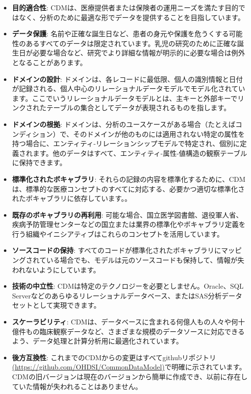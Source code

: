 \documentclass[
  11pt]{book}
\providecommand{\tightlist}{%
  \setlength{\itemsep}{0pt}\setlength{\parskip}{0pt}}
\theoremstyle{definition}
\theoremstyle{definition}
\theoremstyle{definition}
\theoremstyle{definition}
\theoremstyle{remark}
\begin{document}
\begin{itemize}
\tightlist
\item
  \textbf{目的適合性}: CDMは、医療提供者または保険者の運用ニーズを満たす目的ではなく、分析のために最適な形でデータを提供することを目指しています。 
\item
  \textbf{データ保護}: 名前や正確な誕生日など、患者の身元や保護を危うくする可能性のあるすべてのデータは限定されています。乳児の研究のために正確な誕生日が必要な場合など、研究でより詳細な情報が明示的に必要な場合は例外となることがあります。 
\item
  \textbf{ドメインの設計}: ドメインは、各レコードに最低限、個人の識別情報と日付が記録される、個人中心のリレーショナルデータモデルでモデル化されています。ここでいうリレーショナルデータモデルとは、主キーと外部キーでリンクされたテーブルの集合としてデータが表現されるものを指します。
\item
  \textbf{ドメインの根拠}: ドメインは、分析のユースケースがある場合（たとえばコンディション）で、そのドメインが他のものには適用されない特定の属性を持つ場合に、エンティティ-リレーションシップモデルで特定され、個別に定義されます。他のデータはすべて、エンティティ-属性-値構造の観察テーブルに保持できます。 
\item
  \textbf{標準化されたボキャブラリ}: それらの記録の内容を標準化するために、CDMは、標準的な医療コンセプトのすべてに対応する、必要かつ適切な標準化されたボキャブラリに依存しています。。
\item
  \textbf{既存のボキャブラリの再利用}: 可能な場合、国立医学図書館、退役軍人省、疾病予防管理センターなどの国立または業界の標準化やボキャブラリ定義を行う組織やイニシアティブはこれらのコンセプトを活用しています。
\item
  \textbf{ソースコードの保持}: すべてのコードが標準化されたボキャブラリにマッピングされている場合でも、モデルは元のソースコードも保持して、情報が失われないようにしています。  
\item
  \textbf{技術の中立性}: CDMは特定のテクノロジーを必要としません。Oracle、SQL Serverなどのあらゆるリレーショナルデータベース、またはSAS分析データセットとして実現できます。 
\item
  \textbf{スケーラビリティ}: CDMは、データベースに含まれる何億人もの人々や何十億件もの臨床観察データなど、さまざまな規模のデータソースに対応できるよう、データ処理と計算分析用に最適化されています。 
\item
  \textbf{後方互換性}: これまでのCDMからの変更はすべてgithubリポジトリ\href{https://github.com/OHDSI/CommonDataModel}{(https://github.com/OHDSI/CommonDataModel)}で明確に示されています。CDMの旧バージョンは現在のバージョンから簡単に作成でき、以前に存在していた情報が失われることはありません。 
\end{itemize}
\end{document}
